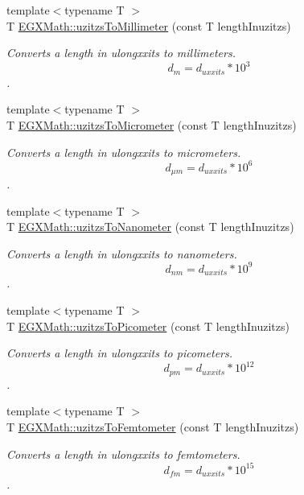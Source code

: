 \begin{DoxyCompactItemize}
{\footnotesize template$<$typename T $>$ }\\T \mbox{\hyperlink{group___e_g_x_math-_conversions-_length_conversions-uzitzs-_s_i_gaf507dd646327861da523586b417d132e}{E\+G\+X\+Math\+::uzitzs\+To\+Millimeter}} (const T length\+Inuzitzs)
\begin{DoxyCompactList}\small\item\em Converts a length in ulongxxits to millimeters. \[ d_{m}=d_{uxxits} * 10^{3} \]. \end{DoxyCompactList}\item 
{\footnotesize template$<$typename T $>$ }\\T \mbox{\hyperlink{group___e_g_x_math-_conversions-_length_conversions-uzitzs-_s_i_ga0bd484a80b8b66cd5272bbbc1fe6b642}{E\+G\+X\+Math\+::uzitzs\+To\+Micrometer}} (const T length\+Inuzitzs)
\begin{DoxyCompactList}\small\item\em Converts a length in ulongxxits to micrometers. \[ d_{\mu m}=d_{uxxits} * 10^{6} \]. \end{DoxyCompactList}\item 
{\footnotesize template$<$typename T $>$ }\\T \mbox{\hyperlink{group___e_g_x_math-_conversions-_length_conversions-uzitzs-_s_i_ga6c21ffa2ef282d817d349c249eaaa21f}{E\+G\+X\+Math\+::uzitzs\+To\+Nanometer}} (const T length\+Inuzitzs)
\begin{DoxyCompactList}\small\item\em Converts a length in ulongxxits to nanometers. \[ d_{nm}=d_{uxxits} * 10^{9} \]. \end{DoxyCompactList}\item 
{\footnotesize template$<$typename T $>$ }\\T \mbox{\hyperlink{group___e_g_x_math-_conversions-_length_conversions-uzitzs-_s_i_ga48c60a4876ac426d1717096263648a4d}{E\+G\+X\+Math\+::uzitzs\+To\+Picometer}} (const T length\+Inuzitzs)
\begin{DoxyCompactList}\small\item\em Converts a length in ulongxxits to picometers. \[ d_{pm}=d_{uxxits} * 10^{12} \]. \end{DoxyCompactList}\item 
{\footnotesize template$<$typename T $>$ }\\T \mbox{\hyperlink{group___e_g_x_math-_conversions-_length_conversions-uzitzs-_s_i_ga55b363df9781c5d92c86bcef272dfc7f}{E\+G\+X\+Math\+::uzitzs\+To\+Femtometer}} (const T length\+Inuzitzs)
\begin{DoxyCompactList}\small\item\em Converts a length in ulongxxits to femtometers. \[ d_{fm}=d_{uxxits} * 10^{15} \]. \end{DoxyCompactList}\item 

\end{DoxyCompactItemize}
